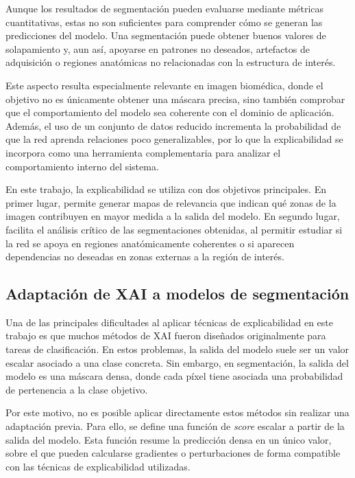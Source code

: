 Aunque los resultados de segmentación pueden evaluarse mediante métricas cuantitativas, estas no son suficientes para comprender cómo se generan las predicciones del modelo. Una segmentación puede obtener buenos valores de solapamiento y, aun así, apoyarse en patrones no deseados, artefactos de adquisición o regiones anatómicas no relacionadas con la estructura de interés.

Este aspecto resulta especialmente relevante en imagen biomédica, donde el objetivo no es únicamente obtener una máscara precisa, sino también comprobar que el comportamiento del modelo sea coherente con el dominio de aplicación. Además, el uso de un conjunto de datos reducido incrementa la probabilidad de que la red aprenda relaciones poco generalizables, por lo que la explicabilidad se incorpora como una herramienta complementaria para analizar el comportamiento interno del sistema.

En este trabajo, la explicabilidad se utiliza con dos objetivos principales. En primer lugar, permite generar mapas de relevancia que indican qué zonas de la imagen contribuyen en mayor medida a la salida del modelo. En segundo lugar, facilita el análisis crítico de las segmentaciones obtenidas, al permitir estudiar si la red se apoya en regiones anatómicamente coherentes o si aparecen dependencias no deseadas en zonas externas a la región de interés.

\subsection{Adaptación de XAI a modelos de segmentación}

Una de las principales dificultades al aplicar técnicas de explicabilidad en este trabajo es que muchos métodos de XAI fueron diseñados originalmente para tareas de clasificación. En estos problemas, la salida del modelo suele ser un valor escalar asociado a una clase concreta. Sin embargo, en segmentación, la salida del modelo es una máscara densa, donde cada píxel tiene asociada una probabilidad de pertenencia a la clase objetivo.

Por este motivo, no es posible aplicar directamente estos métodos sin realizar una adaptación previa. Para ello, se define una función de \textit{score} escalar a partir de la salida del modelo. Esta función resume la predicción densa en un único valor, sobre el que pueden calcularse gradientes o perturbaciones de forma compatible con las técnicas de explicabilidad utilizadas.

